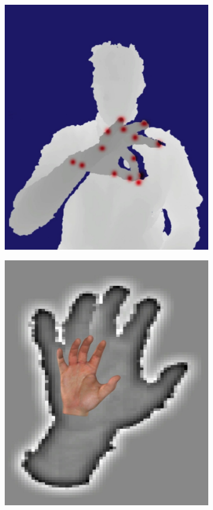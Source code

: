 \begin{figure}[ht]
\begin{subfigure}{0.28125\textwidth}
                \includegraphics[width=\textwidth]{figures_1_hand_tracking/screenshot2_clipped}
                \caption{\footnotesize }
        \end{subfigure}
        \begin{subfigure}{0.28125\textwidth}
                \centering
                \includegraphics[width=\textwidth]{figures_1_hand_tracking/screenshot3_clipped}

\end{subfigure}
\end{figure}
